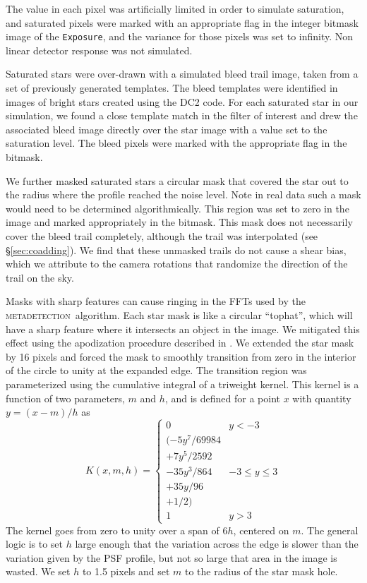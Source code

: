 \documentclass[twocolumn,twocolappendix,astrosym]{openjournal}
\newcommand{\calexp}{\texttt{Exposure}}
\newcommand{\mdet}{\textsc{metadetection}}
\begin{document}
The value in each pixel was artificially limited in order to simulate
saturation, and saturated pixels were marked with an appropriate flag in the
integer bitmask image of the \calexp, and the variance for those
pixels was set to infinity.  Non linear detector response was not simulated.

Saturated stars were over-drawn with a simulated bleed trail image, taken from
a set of previously generated templates.  The bleed templates were identified
in images of bright stars created using the DC2 code.  For each saturated star
in our simulation, we found a close template match in the filter of interest
and drew the associated bleed image directly over the star image with a value
set to the saturation level. The bleed pixels were marked with the appropriate
flag in the bitmask.

We further masked saturated stars a circular mask that covered the star out to
the radius where the profile reached the noise level.  Note in real data such a
mask would need to be determined algorithmically.   This region was set to zero
in the image and marked appropriately in the bitmask.   This mask does not
necessarily cover the bleed trail completely, although the trail was
interpolated (see \S \ref{sec:coadding}).  We find that these unmasked trails
do not cause a shear bias, which we attribute to the camera rotations that
randomize the direction of the trail on the sky.

Masks with sharp features can cause ringing in the FFTs used by the \mdet\
algorithm.   Each star mask is like a circular ``tophat'', which will have a
sharp feature where it intersects an object in the image.  We mitigated this
effect using the apodization procedure described in \citet{BeckerMdetCoadd}. We
extended the star mask by 16 pixels and forced the mask to smoothly transition
from zero in the interior of the circle to unity at the expanded edge. The
transition region was parameterized using the cumulative integral of a
triweight kernel. This kernel is a function of two parameters, $m$ and $h$, and
is defined for a point $x$ with quantity $y = (x-m)/h$ as
\begin{equation}
K(x, m, h) = \begin{cases}
0 & y < -3 \\
(-5y^7 / 69984 \\
+ 7y^5 / 2592 \\
- 35y^3 / 864 & -3 \le y \le 3 \\
+ 35y / 96 \\
+ 1 / 2) \\
1 & y > 3
\end{cases}
\end{equation}
The kernel goes from zero to unity over a span of $6h$, centered on $m$.
The general logic is to set $h$ large enough that the variation across the edge is slower
than the variation given by the PSF profile, but not so large that area in the image is
wasted. We set $h$ to 1.5 pixels and set $m$ to the radius of the star mask hole.
\end{document}
